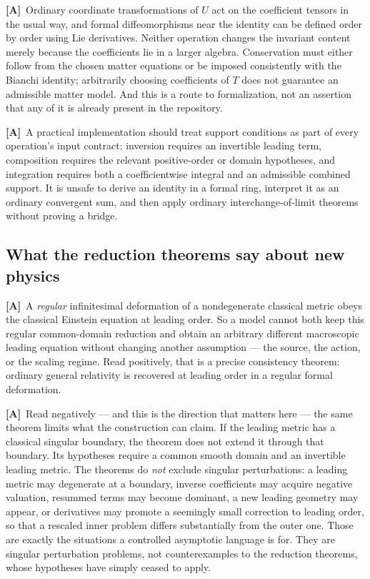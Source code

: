 \documentclass[11pt,letterpaper]{article}
\numberwithin{equation}{section}
\theoremstyle{definition}
\theoremstyle{remark}
\newcommand{\TA}{\textcolor{TierA}{\textsf{\bfseries[A]}}}
\begin{document}
\TA\ Ordinary coordinate transformations of $U$ act on the coefficient tensors
in the usual way, and formal diffeomorphisms near the identity can be defined
order by order using Lie derivatives. Neither operation changes the invariant
content merely because the coefficients lie in a larger algebra. Conservation
must either follow from the chosen matter equations or be imposed consistently
with the Bianchi identity; arbitrarily choosing coefficients of $T$ does not
guarantee an admissible matter model. And this is a route to formalization, not
an assertion that any of it is already present in the repository.

\TA\ A practical implementation should treat support conditions as part of
every operation's input contract: inversion requires an invertible leading
term, composition requires the relevant positive-order or domain hypotheses,
and integration requires both a coefficientwise integral and an admissible
combined support. It is unsafe to derive an identity in a formal ring,
interpret it as an ordinary convergent sum, and then apply ordinary
interchange-of-limit theorems without proving a bridge.

\subsection{What the reduction theorems say about new physics}
\label{phys:sub:newphysics}

\TA\ A \emph{regular} infinitesimal deformation of a nondegenerate classical
metric obeys the classical Einstein equation at leading order. So a model
cannot both keep this regular common-domain reduction and obtain an arbitrary
different macroscopic leading equation without changing another assumption ---
the source, the action, or the scaling regime. Read positively, that is a
precise consistency theorem: ordinary general relativity is recovered at
leading order in a regular formal deformation.

\TA\ Read negatively --- and this is the direction that matters here --- the
same theorem limits what the construction can claim. If the leading metric has
a classical singular boundary, the theorem does not extend it through that
boundary. Its hypotheses require a common smooth domain and an invertible
leading metric. The theorems do \emph{not} exclude singular perturbations: a
leading metric may degenerate at a boundary, inverse coefficients may acquire
negative valuation, resummed terms may become dominant, a new leading geometry
may appear, or derivatives may promote a seemingly small correction to leading
order, so that a rescaled inner problem differs substantially from the outer
one. Those are exactly the situations a controlled asymptotic language is for.
They are singular perturbation problems, not counterexamples to the reduction
theorems, whose hypotheses have simply ceased to apply.
\end{document}
